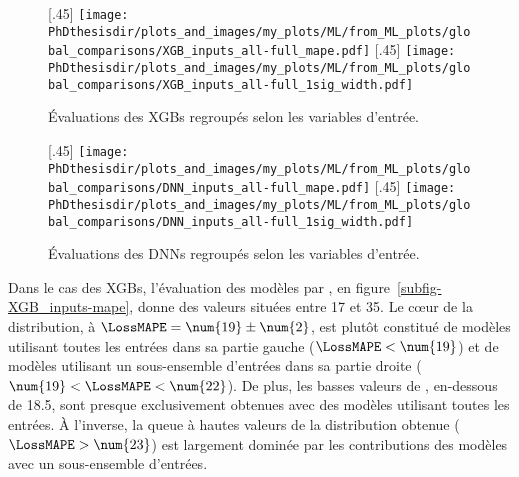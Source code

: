 \begin{figure}[h]
\centering

[.45\textwidth]
{\texttt{[image: \\PhDthesisdir/plots\_and\_images/my\_plots/ML/from\_ML\_plots/global\_comparisons/XGB\_inputs\_all-full\_mape.pdf]}\vspace{-\baselineskip}}
\hfill
{}[.45\textwidth]
{\texttt{[image: \\PhDthesisdir/plots\_and\_images/my\_plots/ML/from\_ML\_plots/global\_comparisons/XGB\_inputs\_all-full\_1sig\_width.pdf]}\vspace{-\baselineskip}}

\caption{Évaluations des XGBs regroupés selon les variables d'entrée.}
\label{fig-XGB_inputs}
\end{figure}
\begin{figure}[h]
\centering

[.45\textwidth]
{\texttt{[image: \\PhDthesisdir/plots\_and\_images/my\_plots/ML/from\_ML\_plots/global\_comparisons/DNN\_inputs\_all-full\_mape.pdf]}\vspace{-\baselineskip}}
\hfill
{}[.45\textwidth]
{\texttt{[image: \\PhDthesisdir/plots\_and\_images/my\_plots/ML/from\_ML\_plots/global\_comparisons/DNN\_inputs\_all-full\_1sig\_width.pdf]}\vspace{-\baselineskip}}

\caption{Évaluations des DNNs regroupés selon les variables d'entrée.}
\label{fig-DNN_inputs}
\end{figure}
\par
Dans le cas des XGBs,
l'évaluation des modèles par \LossMAPE, en figure~\ref{subfig-XGB_inputs-mape},
donne des valeurs situées entre \num{17} et \num{35}.
Le cœur de la distribution,
à $\LossMAPE=\num{19}\pm\num{2}$,
est plutôt constitué
de modèles utilisant
toutes les entrées
dans sa partie gauche ($\LossMAPE<\num{19}$)
et
de modèles utilisant
un sous-ensemble d'entrées
dans sa partie droite ($\num{19}<\LossMAPE<\num{22}$).
De plus, les basses valeurs de \LossMAPE, en-dessous de \num{18.5},
sont presque exclusivement obtenues avec des modèles utilisant toutes les entrées.
À l'inverse, la queue à hautes valeurs de la distribution obtenue ($\LossMAPE>\num{23}$) est largement dominée par les contributions des modèles avec un sous-ensemble d'entrées.
